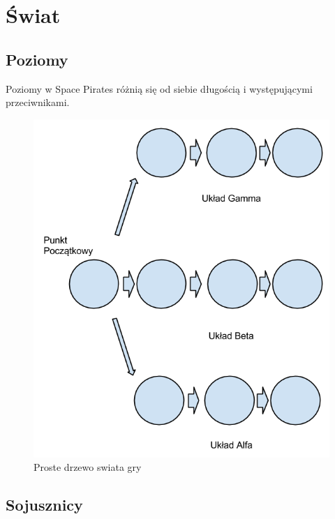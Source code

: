 \chapter{Świat}

\section{Poziomy}
Poziomy w Space Pirates różnią się od siebie długością i występującymi przeciwnikami.

\begin{figure}
\centering
	\includegraphics[scale=0.3]{proste_drzewo_swiata}
\caption{Proste drzewo swiata gry}
\end{figure}

\section{Sojusznicy}
